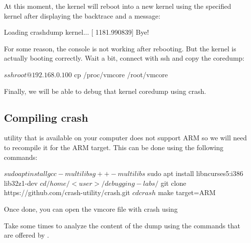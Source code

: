 At this moment, the kernel will reboot into a new kernel using the specified
kernel after displaying the backtrace and a message:

\begin{bashinput}
[ 1181.987971] Loading crashdump kernel...
[ 1181.990839] Bye!
\end{bashinput}

For some reason, the console is not working after rebooting. But the kernel is
actually booting correctly. Wait a bit, connect with ssh and copy the coredump:

\begin{bashinput}
$ ssh root@192.168.0.100
$ cp /proc/vmcore /root/vmcore
\end{bashinput}

Finally, we will be able to debug that kernel coredump using crash.

\subsection{Compiling crash}

 utility that is available on your computer does not support ARM
so we will need to recompile it for the ARM target. This can be done using the
following commands:

\begin{bashinput}
$ sudo apt install gcc-multilibs g++-multilibs
$ sudo apt install libncurses5:i386 lib32z1-dev
$ cd /home/<user>/debugging-labs/
$ git clone https://github.com/crash-utility/crash.git
$ cd crash
$ make target=ARM
\end{bashinput}

Once done, you can open the vmcore file with crash using

Take some times to analyze the content of the dump using the commands that are
offered by .